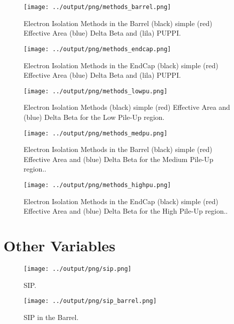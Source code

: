 \documentclass[11pt]{book}
\begin{document}
\begin{figure}[ht]
\centering
\texttt{[image: ../output/png/methods\_barrel.png]}
\caption{Electron Isolation Methods in the Barrel (black) simple (red) Effective Area (blue) Delta Beta and (lila) PUPPI.}
\label{fig:methods_barrel}
\end{figure}

\begin{figure}[ht]
\centering
\texttt{[image: ../output/png/methods\_endcap.png]}
\caption{Electron Isolation Methods in the EndCap (black) simple (red) Effective Area (blue) Delta Beta and (lila) PUPPI.}
\label{fig:methods_endcap}
\end{figure}


\begin{figure}[ht]
\centering
\texttt{[image: ../output/png/methods\_lowpu.png]}
\caption{Electron Isolation Methods (black) simple (red) Effective Area and (blue) Delta Beta for the Low Pile-Up region.}
\label{fig:methods_lowpu}
\end{figure}

\begin{figure}[ht]
\centering
\texttt{[image: ../output/png/methods\_medpu.png]}
\caption{Electron Isolation Methods in the Barrel (black) simple (red) Effective Area and (blue) Delta Beta for the Medium Pile-Up region..}
\label{fig:methods_medpu}
\end{figure}

\begin{figure}[ht]
\centering
\texttt{[image: ../output/png/methods\_highpu.png]}
\caption{Electron Isolation Methods in the EndCap (black) simple (red) Effective Area and (blue) Delta Beta for the High Pile-Up region..}
\label{fig:methods_highpu}
\end{figure}
\clearpage


\chapter{Other Variables}
\begin{figure}[ht]
\centering
\texttt{[image: ../output/png/sip.png]}
\caption{SIP.}
\label{fig:sip}
\end{figure}

\begin{figure}[ht]
\centering
\texttt{[image: ../output/png/sip\_barrel.png]}
\caption{SIP in the Barrel.}
\label{fig:sip_barrel}
\end{figure}
\end{document}
